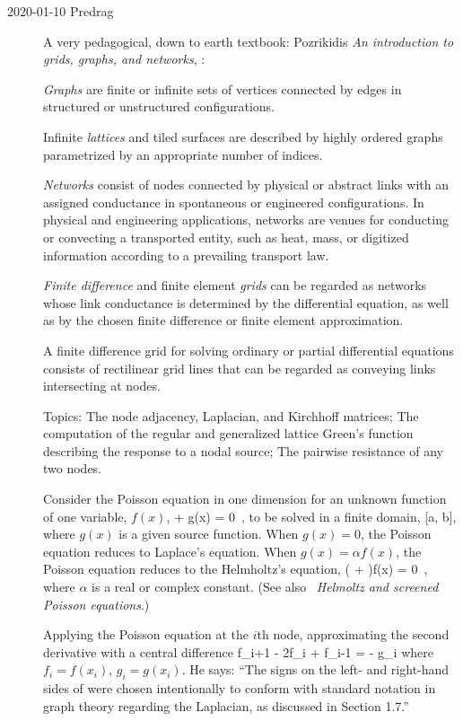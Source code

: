 \begin{description}
\item[2020-01-10 Predrag]
A very pedagogical, down to earth textbook:
Pozrikidis
{\em An introduction to grids, graphs, and networks},
:

\emph{Graphs} are finite or infinite sets of vertices connected by edges in
structured or unstructured configurations.

Infinite \emph{lattices} and tiled surfaces are described by highly ordered graphs
parametrized by an appropriate number of indices.

\emph{Networks} consist of nodes connected by physical or abstract links
with an assigned conductance in spontaneous or engineered configurations.
In physical and engineering applications, networks are venues for
conducting or convecting a transported entity, such as heat, mass, or
digitized information according to a prevailing transport law.

\emph{Finite difference} and finite element \emph{grids} can be regarded
as networks whose link conductance is determined by the differential
equation, as well as by the chosen finite difference or finite element
approximation.

A finite difference grid for solving ordinary or partial differential
equations consists of rectilinear grid lines that can be regarded as conveying
links intersecting at nodes.

Topics:
The node adjacency, Laplacian, and Kirchhoff matrices;
The computation of the regular and generalized lattice Green's function
describing the response to a nodal source;
The pairwise resistance of any two nodes.

Consider the Poisson equation in one dimension for an unknown function of one
variable, $f(x)$,
\beq
{} + g(x) = 0
\,,
to be solved in a finite domain, [a, b], where $g(x)$ is a given source
function. When $g(x) = 0$, the Poisson equation reduces to Laplace's
equation. When $g(x) = {\alpha}f(x)$, the Poisson equation reduces to
the Helmholtz's equation,
\beq
\left( + {\alpha}\right)f(x) = 0
\,,
where $\alpha$ is a real or complex constant.
(See also ~{\em Helmoltz and screened Poisson
equations}.)



Applying the Poisson equation at the $i$th node, approximating the second
derivative with a central difference
\beq
f_{i+1} - 2f_{i} + f_{i-1} = - g_{i}
where $f_{i} = f (x_{i})$, $g_{i} = g(x_{i})$.
He says: ``The signs on the left- and right-hand sides of
 were chosen intentionally to conform with
standard notation in graph theory regarding the Laplacian, as discussed
in Section 1.7.''


\end{description}

